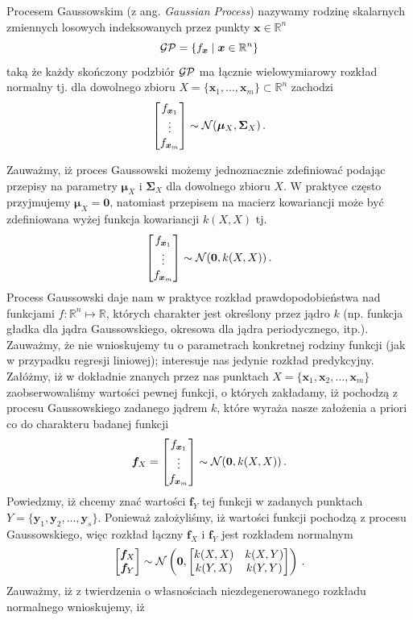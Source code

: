 \documentclass{myclass}
\numberwithin{equation}{subsection}
\begin{document}
\begin{definition}
Procesem Gaussowskim (z ang. \textit{Gaussian Process}) nazywamy rodzinę skalarnych zmiennych
losowych indeksowanych przez punkty \(\bm{x} \in \mathbb{R}^n\)
\[
\mathcal{GP} = \left\{f_{\bm{x}} \mid \bm{x} \in \mathbb{R}^n\right\}
\]
taką że każdy skończony podzbiór \(\mathcal{GP}\) ma łącznie wielowymiarowy rozkład normalny tj. dla
dowolnego zbioru \(X = \{\bm{x}_1, \ldots, \bm{x}_m\} \subset \mathbb{R}^n\) zachodzi
\[
\mqty[f_{\bm{x}_1} \\ \vdots \\ f_{\bm{x}_m}] \sim \mc{N}(\bm{\mu}_X, \bm{\Sigma}_{X})\,.
\]
\end{definition}

Zauważmy, iż proces Gaussowski możemy jednoznacznie zdefiniować podając przepisy na parametry
\(\bm{\mu}_X\) i \(\bm{\Sigma}_X\) dla dowolnego zbioru \(X\). W praktyce często przyjmujemy
\(\bm{\mu}_X = \bm{0}\), natomiast przepisem na macierz kowariancji może być zdefiniowana wyżej
funkcja kowariancji \(k(X,X)\) tj.
\[
\mqty[f_{\bm{x}_1} \\ \vdots \\ f_{\bm{x}_m}] \sim \mc{N}(\bm{0}, k(X,X))\,.
\]
Process Gaussowski daje nam w praktyce rozkład prawdopodobieństwa nad funkcjami
\(f:\mathbb{R}^n\mapsto\mathbb{R}\), których charakter jest określony przez jądro \(k\) (np. funkcja
gładka dla jądra Gaussowskiego, okresowa dla jądra periodycznego, itp.). Zauważmy, że nie
wnioskujemy tu o parametrach konkretnej rodziny funkcji (jak w przypadku regresji liniowej);
interesuje nas jedynie rozkład predykcyjny. Załóżmy, iż w dokładnie znanych przez nas punktach \(X =
\{\bm{x}_1,\bm{x}_2,\ldots,\bm{x}_m\}\) zaobserwowaliśmy wartości pewnej funkcji, o których
zakładamy, iż pochodzą z procesu Gaussowskiego zadanego jądrem \(k\), które wyraża nasze założenia a
priori co do charakteru badanej funkcji
\[
\bm{f}_X = \mqty[f_{\bm{x}_1} \\ \vdots \\ f_{\bm{x}_m}] \sim \mc{N}(\bm{0}, k(X,X))\,.
\]
Powiedzmy, iż chcemy znać wartości \(\bm{f}_Y\) tej funkcji w zadanych punktach \(Y =
\{\bm{y}_1,\bm{y}_2,\ldots,\bm{y}_s\}\). Ponieważ założyliśmy, iż wartości funkcji pochodzą z
procesu Gaussowskiego, więc rozkład łączny \(\bm{f}_X\) i \(\bm{f}_Y\) jest rozkładem normalnym
\[
\mqty[\bm{f}_X \\ \bm{f}_Y] \sim \mc{N}\left(\bm{0}, \mqty[k(X,X) & k(X,Y) \\ k(Y,X) & k(Y,Y)]\right)\,.
\]
Zauważmy, iż z twierdzenia o własnościach niezdegenerowanego rozkładu normalnego wnioskujemy, iż
\end{document}
